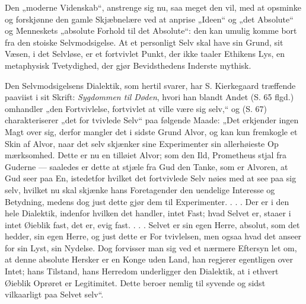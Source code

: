 \documentclass[12pt]{book}
\newcommand{\opage}[1]{\marginnote{\footnotesize\textit{[#1]}}}
\begin{document}
Den „moderne Videnskab“, anstrenge sig nu, saa\-%
meget den vil, med at opsminke og forskjønne den gamle
Skjæbnelære ved at anprise „Ideen“ og „det Absolute“
og Menneskets „absolute Forhold til det Absolute“: den
kan umulig komme bort fra den stoiske Selvmodsigelse.
At et personligt Selv skal have sin Grund, sit Væsen, i
det Selvløse, er et fortvivlet Punkt, der ikke taaler
Ethikens Lys, en metaphysisk Tvetydighed, der gjør
Bevidsthedens Inderste mythisk.

Den Selvmodsigelsens Dialektik, som hertil svarer,
har S. Kierkegaard træffende paaviist i sit Skrift:
\emph{Sygdommen til Døden}, hvori han blandt Andet
(S. 65 flgd.) omhandler „den Fortvivlelse, fortvivlet at
ville være sig selv,“ og (S. 67) charakteriserer „det for\-%
tvivlede Selv“ paa følgende Maade: „Det erkjender
ingen Magt over sig, derfor mangler det i sidste Grund
Alvor, og kan kun fremkogle et Skin af Alvor, naar
det selv skjænker sine Experimenter sin allerhøieste Op\-%
mærksomhed. Dette er nu en tilløiet Alvor; som den
Ild, Prometheus stjal fra Guderne --- saaledes er dette
\opage{213}\setcounter{footnote}{0}%
at stjæle fra Gud den Tanke, som er Alvoren, at Gud
seer paa En, istedetfor hvilket det fortvivlede Selv
nøies med at see paa sig selv, hvilket nu skal skjænke
hans Foretagender den uendelige Interesse og Betydning,
medens dog just dette gjør dem til Experimenter. . . .
Der er i den hele Dialektik, indenfor hvilken det handler,
intet Fast; hvad Selvet er, staaer i intet Øieblik fast,
det er, evig fast. . . . Selvet er sin egen Herre, absolut,
som det hedder, sin egen Herre, og just dette er For\-%
tvivlelsen, men ogsaa hvad det anseer for sin Lyst, sin
Nydelse. Dog forvisser man sig ved et nærmere Eftersyn
let om, at denne absolute Hersker er en Konge uden
Land, han regjerer egentligen over Intet; hans Tilstand,
hans Herredom underligger den Dialektik, at i ethvert
Øieblik Oprøret er Legitimitet. Dette beroer nemlig til
syvende og sidst vilkaarligt paa Selvet selv“.
\end{document}
